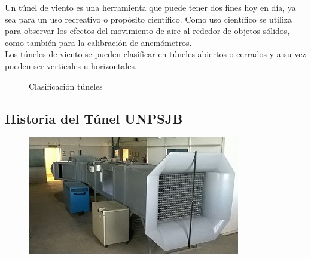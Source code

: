 

\begin{minipage}[t]{.3\textwidth}
	\centering{}
	\label{fig:tunelRec}
\end{minipage}	
\begin{minipage}[t]{.7\textwidth}

Un túnel de viento es una herramienta que puede tener dos fines hoy en día, ya sea para un uso recreativo o propósito científico.
Como uso científico se utiliza para observar los efectos del movimiento de aire al rededor de objetos sólidos, como también para la calibración de anemómetros.\\
Los túneles de viento se pueden clasificar en túneles abiertos o cerrados y a su vez pueden ser verticales u horizontales. 
\end{minipage}

\begin{figure}[htbp]
    \centering
    \caption{Clasificación túneles} \label{fig:abierto}
    \end{figure}


\subsection{Historia del Túnel UNPSJB}

\begin{figure} 
	\begin{center}
		\includegraphics[scale=0.45]{tunel_unpsjb.JPG}
		\label{fig:tunelUni}
	\end{center}
	\vspace{-20pt}
	\end{figure}


